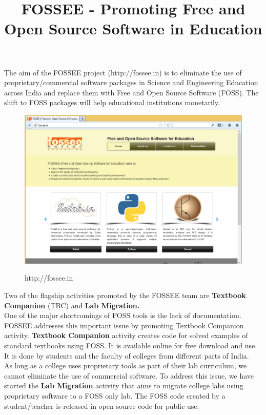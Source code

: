 \documentclass[9pt]{article}
\title{FOSSEE - Promoting Free and Open Source Software in Education}{\vspace{-5ex}}
\begin{document}
\setlength{\droptitle}{-3cm}    %

\maketitle

The aim of the FOSSEE project (http://fossee.in) is to eliminate the
use of proprietary/commercial software packages in Science and
Engineering Education across India and replace them with Free and Open
Source Software (FOSS). The shift to FOSS packages will help
educational institutions monetarily. \\

\begin{figure}[ht]
\centering
\fboxsep=0mm%
\fboxrule=1pt%
{\includegraphics[width=1\columnwidth]{fossee-site.png}}
\caption{http://fossee.in}\label{fossee}
\end{figure}

Two of the flagship activities promoted by the FOSSEE team are
{\bf{Textbook Companion}} (TBC) and {\bf{Lab Migration.}} \\

One of the major shortcomings of FOSS tools is the lack of
documentation. FOSSEE addresses this important issue by promoting
Textbook Companion activity. {\bf{Textbook Companion}} activity
creates code for solved examples of standard textbooks using FOSS. It
is available online for free download and use. It is done by students
and the faculty of colleges from different parts of India. \\

As long as a college uses proprietary tools as part of their lab
curriculum, we cannot eliminate the use of commercial software. To
address this issue, we have started the {\bf{Lab Migration}} activity
that aims to migrate college labs using proprietary software to a FOSS
only lab. The FOSS code created by a student/teacher is released in
open source code for public use. \\
\end{document}
